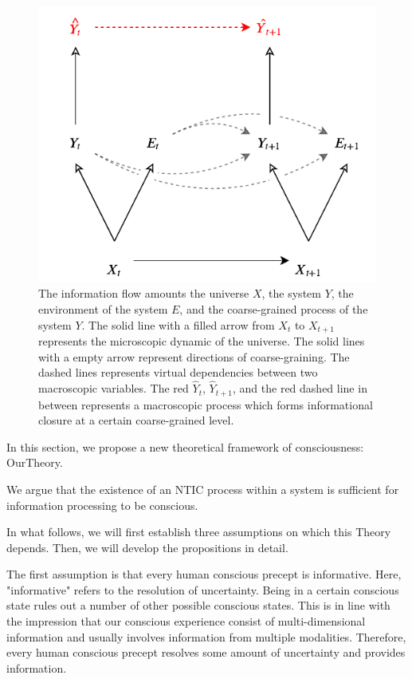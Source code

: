 \documentclass[utf8]{article}
\begin{document}
		\begin{figure}[H]
		    \centering
		    \label{fig:fullgraph}
			\includegraphics[width=\textwidth]{WritingMaterials/Fig_FullGraph/FullGraph.pdf}
			\caption{The information flow amounts the universe $X$, the system $Y$, the environment of the system $E$, and the coarse-grained process of the system $Y$. The solid line with a filled arrow from $X_t$ to $X_{t+1}$ represents the microscopic dynamic of the universe. The solid lines with a empty arrow represent directions of coarse-graining. The dashed lines represents virtual dependencies between  two macroscopic variables. The red $\hat{Y}_t$, $\hat{Y}_{t+1}$, and the red dashed line in between represents a macroscopic process which forms informational closure at a certain coarse-grained level.}
	   	\end{figure}

        In this section, we propose a new theoretical framework of consciousness: \acf{OurTheory}.
        
        We argue that the existence of an NTIC process within a system is sufficient for information processing to be conscious.

        In what follows, we will first establish three assumptions on which this Theory depends. Then, we will develop the propositions in detail. 
    
        The first assumption is that every human conscious precept is informative. Here, "informative" refers to the resolution of uncertainty. Being in a certain conscious state rules out a  number of other possible conscious states. This is in line with the impression that our conscious experience consist of multi-dimensional information and usually involves information from multiple modalities. Therefore, every human conscious precept resolves some amount of uncertainty and provides information.  
        
\end{document}
